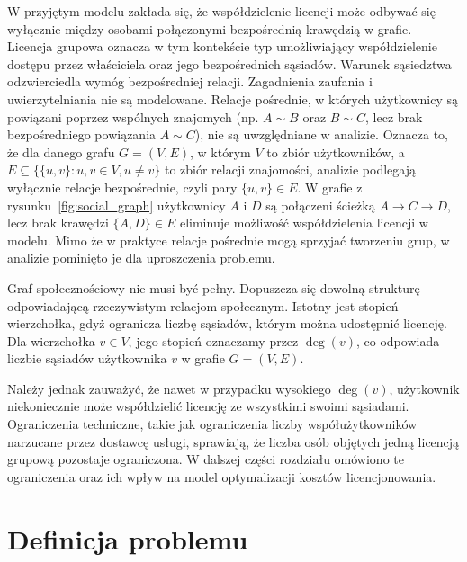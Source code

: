 W przyjętym modelu zakłada się, że współdzielenie licencji może odbywać się wyłącznie między osobami połączonymi bezpośrednią krawędzią w grafie. Licencja grupowa oznacza w tym kontekście typ umożliwiający współdzielenie dostępu przez właściciela oraz jego bezpośrednich sąsiadów. Warunek sąsiedztwa odzwierciedla wymóg bezpośredniej relacji. Zagadnienia zaufania i uwierzytelniania nie są modelowane. Relacje pośrednie, w których użytkownicy są powiązani poprzez wspólnych znajomych (np. \( A \sim B \) oraz \( B \sim C \), lecz brak bezpośredniego powiązania \( A \sim C \)), nie są uwzględniane w analizie. Oznacza to, że dla danego grafu \( G = (V, E) \),
w którym \( V \) to zbiór użytkowników, a \( E \subseteq \{ \{u,v\} : u,v \in V, u \neq v \} \) to zbiór relacji znajomości, analizie podlegają wyłącznie relacje bezpośrednie, czyli pary \( \{u, v\} \in E \).
W grafie z rysunku~\ref{fig:social_graph} użytkownicy \( A \) i \( D \) są połączeni ścieżką \( A \rightarrow C \rightarrow D \), lecz brak krawędzi \( \{A,D\} \in E \) eliminuje możliwość współdzielenia licencji w modelu.
Mimo że w praktyce relacje pośrednie mogą sprzyjać tworzeniu grup, w analizie pominięto je dla uproszczenia problemu.

Graf społecznościowy nie musi być pełny. Dopuszcza się dowolną strukturę odpowiadającą rzeczywistym relacjom społecznym. Istotny jest stopień wierzchołka, gdyż ogranicza liczbę sąsiadów, którym można udostępnić licencję. Dla wierzchołka \( v \in V \), jego stopień oznaczamy przez \( \deg(v) \), co odpowiada liczbie sąsiadów użytkownika \( v \) w grafie \( G = (V, E) \).

Należy jednak zauważyć, że nawet w przypadku wysokiego \( \deg(v) \), użytkownik niekoniecznie może współdzielić licencję ze wszystkimi swoimi sąsiadami. Ograniczenia techniczne, takie jak ograniczenia liczby współużytkowników narzucane przez dostawcę usługi, sprawiają, że liczba osób objętych jedną licencją grupową pozostaje ograniczona. W dalszej części rozdziału omówiono te ograniczenia oraz ich wpływ na model optymalizacji kosztów licencjonowania.


\section{Definicja problemu}\label{sec:model-formal}

